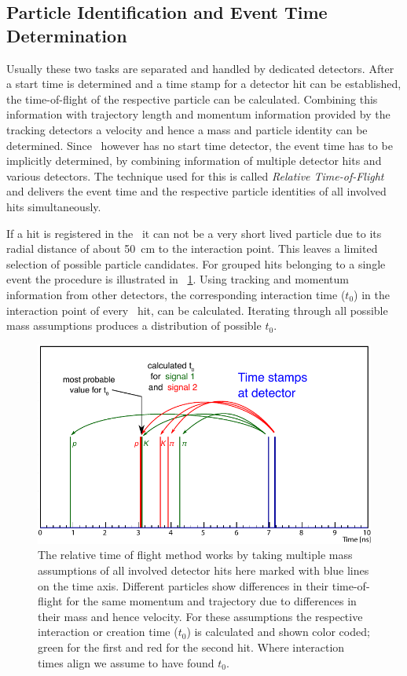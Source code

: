 \documentclass[../BTOF_summary.tex]{subfiles}
\begin{document}
\subsection{Particle Identification and Event Time Determination}

Usually these two tasks are separated and handled by dedicated detectors.
After a start time is determined and a time stamp for a detector hit can be established, the time-of-flight of the respective particle can be calculated.
Combining this information with trajectory length and momentum information provided by the tracking detectors a velocity and hence a mass and particle identity can be determined.
Since \panda\ however has no start time detector, the event time has to be implicitly determined, by combining information of multiple detector hits and various detectors.
The technique used for this is called \emph{Relative Time-of-Flight} and delivers the event time and the respective particle identities of all involved hits simultaneously.

If a hit is registered in the \btofD\ it can not be a very short lived particle due to its radial distance of about \SI{50}{cm} to the interaction point.
This leaves a limited selection of possible particle candidates.
For grouped hits belonging to a single event the procedure is illustrated in \fig ~\ref{fig:relToF}.
Using tracking and momentum information from other detectors, the corresponding interaction time ($t_0$) in the interaction point of every \btof\ hit, can be calculated.
Iterating through all possible mass assumptions produces a distribution of possible $t_0$.
 
\begin{figure}
	\centering
	\includegraphics[width=.9\textwidth]{fig/relTof_basic.pdf}
	\caption{The relative time of flight method works by taking multiple mass assumptions of all involved detector hits here marked with blue lines on the time axis. Different particles show differences in their time-of-flight for the same momentum and trajectory due to differences in their mass and hence velocity. For these assumptions the respective interaction or creation time ($t_0$) is calculated and shown color coded; green for the first and red for the second hit. Where interaction times align we assume to have found $t_0$.}
	\label{fig:relToF}
\end{figure}
\end{document}
